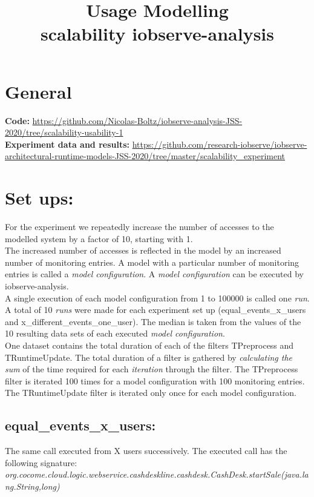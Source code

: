 \documentclass[10pt,a4paper]{article}
\begin{document}
	\title{Usage Modelling\\scalability iobserve-analysis}
	\date{}
	\maketitle
	
	\section{General}
	\textbf{Code:} \url{https://github.com/Nicolas-Boltz/iobserve-analysis-JSS-2020/tree/scalability-usability-1}\\
	\textbf{Experiment data and results:} \url{https://github.com/research-iobserve/iobserve-architectural-runtime-models-JSS-2020/tree/master/scalability_experiment}
	
	\section{Set ups:}
	For the experiment we repeatedly increase the number of accesses to the modelled system by a factor of 10, starting with 1.\\
	The increased number of accesses is reflected in the model by an increased number of monitoring entries.
	A model with a particular number of monitoring entries is called a \emph{model configuration}.
	A \emph{model configuration} can be executed by iobserve-analysis.\\
	A single execution of each model configuration from 1 to 100000 is called one \emph{run}.
	A total of 10 \emph{runs} were made for each experiment set up (equal\_events\_x\_users and x\_different\_events\_one\_user). 
	The median is taken from the values of the 10 resulting data sets of each executed \emph{model configuration}.\\
	One dataset contains the total duration of each of the filters TPreprocess and TRuntimeUpdate. 
	The total duration of a filter is gathered by \emph{calculating the sum} of the time required for each \emph{iteration} through the filter.
	The TPreprocess filter is iterated 100 times for a model configuration with 100 monitoring entries.
	The TRuntimeUpdate filter is iterated only once for each model configuration.
	
	\subsection{equal\_events\_x\_users:}
	The same call executed from X users successively. The executed call has the following signature:\\ \emph{org.cocome.cloud.logic.webservice.cashdeskline.cashdesk.CashDesk.startSale(java.lang.String,long)}
	
\end{document}
